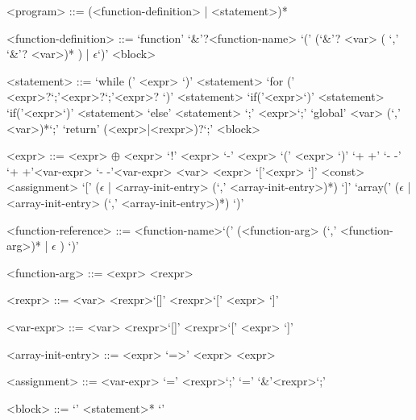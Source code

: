 \begin{grammar}
<program> ::= (<function-definition> | <statement>)*
\end{grammar}
\begin{grammar}
<function-definition> ::= `function' `&'?<function-name> `(' (`&'? <var> ( `,' `&'? <var>)* ) | $\epsilon$`)' <block>
\end{grammar}
\begin{grammar}
<statement> ::= `while (' <expr> `)' <statement>
\alt `for (' <expr>?`;'<expr>?`;'<expr>? `)' <statement>
\alt `if('<expr>`)' <statement>
\alt `if('<expr>`)' <statement> `else' <statement>
\alt `;'
\alt <expr>`;'
\alt `global' <var> (`,' <var>)*`;'
\alt `return' (<expr>|<rexpr>)?`;'
\alt <block>
\end{grammar}
\begin{grammar}
<expr> ::= <expr> $\oplus$ <expr>
\alt `!' <expr>
\alt `-' <expr>
\alt `(' <expr> `)'
`+ +'
`- -'
\alt `+ +'<var-expr>
\alt `- -'<var-expr>
\alt <var>
\alt <expr> `['<expr> `]'
\alt <const>
\alt <assignment>
\alt `[' ($\epsilon$ | <array-init-entry> (`,' <array-init-entry>)*) `]'
\alt `array(' ($\epsilon$ | <array-init-entry> (`,' <array-init-entry>)*) `)'
\end{grammar}
\begin{grammar}
<function-reference> ::= <function-name>`(' (<function-arg> (`,' <function-arg>)* | $\epsilon$ ) `)'
\end{grammar}
\begin{grammar}
<function-arg> ::= <expr> 
\alt <rexpr> 
\end{grammar}
\begin{grammar}
<rexpr> ::= <var> 
\alt <rexpr>`[]'
\alt <rexpr>`[' <expr> `]'
\end{grammar}
\begin{grammar}
<var-expr> ::= <var> 
\alt <rexpr>`[]'
\alt <rexpr>`[' <expr> `]'
\end{grammar}
\begin{grammar}
<array-init-entry> ::= <expr> `=>' <expr> 
\alt <expr>
\end{grammar}
\begin{grammar}
<assignment> ::= <var-expr> `=' <rexpr>`;'
 `=' `&'<rexpr>`;'
\end{grammar}

\begin{grammar}
<block> ::= `{' <statement>* `}'
\end{grammar}
